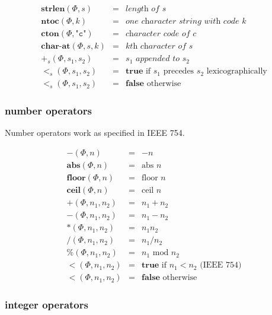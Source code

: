 \documentclass[draft, 10pt]{article}
\newcommand{\num}[0]{n}
\newcommand{\intg}[0]{k}
\newcommand{\str}[0]{s}
\newcommand{\true}[0]{\textbf{true}}
\newcommand{\false}[0]{\textbf{false}}
\newcommand{\opstrlen}[0]{\textbf{strlen}}
\newcommand{\opabs}[0]{\textbf{abs}}
\newcommand{\opfloor}[0]{\textbf{floor}}
\newcommand{\opceil}[0]{\textbf{ceil}}
\newcommand{\opntoc}[0]{\textbf{ntoc}}
\newcommand{\opcton}[0]{\textbf{cton}}
\newcommand{\opneg}[0]{-}
\newcommand{\opcharat}[0]{\textbf{char-at}}
\newcommand{\opadd}[0]{+}
\newcommand{\opsub}[0]{-}
\newcommand{\opmul}[0]{*}
\newcommand{\opdiv}[0]{/}
\newcommand{\opmod}[0]{\%}
\newcommand{\oplt}[0]{<}
\newcommand{\opstrplus}[0]{+_{\str}}
\newcommand{\opstrlt}[0]{<_{\str}}
\newcommand{\heap}[0]{\Phi}
\newcommand{\rununop}[3]{#1(#2,#3)}
\newcommand{\runbinop}[4]{#1(#2,#3,#4)}
\begin{document}
\[
\begin{array}{rcl}
\rununop{\opstrlen}{\heap}{\str} &=& \textit{length of $\str$} \\
\rununop{\opntoc}{\heap}{\intg} &=& \textit{one character string with code $\intg$}\\
\rununop{\opcton}{\heap}{\texttt{"c"}} &=& \textit{character code of c} \\
\runbinop{\opcharat}{\heap}{\str}{\intg} &=& \textit{$\intg$th character of $\str$} \\
\runbinop{\opstrplus}{\heap}{\str_1}{\str_2} &=& \str_1 \textit{ appended to } \str_2 \\
\runbinop{\opstrlt}{\heap}{\str_1}{\str_2} &=& \true \textrm{ if $\str_1$ precedes $\str_2$ lexicographically} \\
\runbinop{\opstrlt}{\heap}{\str_1}{\str_2} &=& \false \textrm{ otherwise} 
\end{array}
\]

\subsubsection{number operators}

Number operators work as specified in IEEE 754.

\[
\begin{array}{rcl}
\rununop{\opneg}{\heap}{\num} &=& -\num \\
\rununop{\opabs}{\heap}{\num} &=& \textrm{abs } \num \\
\rununop{\opfloor}{\heap}{\num} &=& \textrm{floor } \num \\
\rununop{\opceil}{\heap}{\num} &=& \textrm{ceil } \num \\
\runbinop{\opadd}{\heap}{\num_1}{\num_2} &=& \num_1 + \num_2 \\
\runbinop{\opsub}{\heap}{\num_1}{\num_2} &=& \num_1 - \num_2 \\
\runbinop{\opmul}{\heap}{\num_1}{\num_2} &=& \num_1 \num_2 \\
\runbinop{\opdiv}{\heap}{\num_1}{\num_2} &=& \num_1 / \num_2 \\
\runbinop{\opmod}{\heap}{\num_1}{\num_2} &=& \num_1 \textrm{ mod } \num_2 \\
\runbinop{\oplt}{\heap}{\num_1}{\num_2} &=& \true \textrm{ if $\num_1 < \num_2$ (IEEE 754)} \\
\runbinop{\oplt}{\heap}{\num_1}{\num_2} &=& \false \textrm{ otherwise}
\end{array}
\]

\subsubsection{integer operators}
\end{document}
